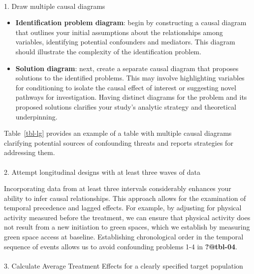 \documentclass[
  single column]{article}
\makeatletter
\let\oldparagraph\paragraph
\renewcommand{\paragraph}{
    \@ifstar
      \xxxParagraphStar
      \xxxParagraphNoStar
  }
\newcommand{\xxxParagraphStar}[1]{\oldparagraph*{#1}\mbox{}}
\newcommand{\xxxParagraphNoStar}[1]{\oldparagraph{#1}\mbox{}}
\providecommand{\tightlist}{%
  \setlength{\itemsep}{0pt}\setlength{\parskip}{0pt}}\usepackage{longtable,booktabs,array}
\makeatother
\begin{document}
\paragraph{1. Draw multiple causal
diagrams}\label{draw-multiple-causal-diagrams-1}

\begin{itemize}
\tightlist
\item
  \textbf{Identification problem diagram}: begin by constructing a
  causal diagram that outlines your initial assumptions about the
  relationships among variables, identifying potential confounders and
  mediators. This diagram should illustrate the complexity of the
  identification problem.
\item
  \textbf{Solution diagram}: next, create a separate causal diagram that
  proposes solutions to the identified problems. This may involve
  highlighting variables for conditioning to isolate the causal effect
  of interest or suggesting novel pathways for investigation. Having
  distinct diagrams for the problem and its proposed solutions clarifies
  your study's analytic strategy and theoretical underpinning.
\end{itemize}

Table~\ref{tbl-lg} provides an example of a table with multiple causal
diagrams clarifying potential sources of confounding threats and reports
strategies for addressing them.

\paragraph{2. Attempt longitudinal designs with at least three waves of
data}\label{attempt-longitudinal-designs-with-at-least-three-waves-of-data}

Incorporating data from at least three intervals considerably enhances
your ability to infer causal relationships. This approach allows for the
examination of temporal precedence and lagged effects. For example, by
adjusting for physical activity measured before the treatment, we can
ensure that physical activity does not result from a new initiation to
green spaces, which we establish by measuring green space access at
baseline. Establishing chronological order in the temporal sequence of
events allows us to avoid confounding problems 1-4 in \textbf{?@tbl-04}.

\paragraph{3. Calculate Average Treatment Effects for a clearly
specified target
population}\label{calculate-average-treatment-effects-for-a-clearly-specified-target-population}
\end{document}
